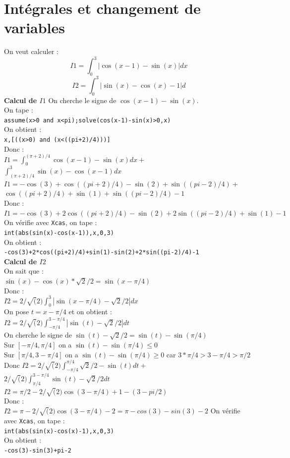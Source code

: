 \documentclass[a4paper,11pt]{book}
\begin{document}
\section{Int\'egrales et changement de variables}
On veut calculer :
$$I1=\int_0^3|\cos(x-1)-\sin(x)|dx$$
$$I2=\int_0^3|\sin(x)-\cos(x)-1|d$$
{\bf Calcul de $I1$}
On cherche le signe de $\cos(x-1)-\sin(x)$.\\
On tape :\\
{\tt assume(x>0 and x<pi);solve(cos(x-1)-sin(x)>0,x)}\\
On obtient :\\
{\tt x,[((x>0) and (x<((pi+2)/4)))]}\\
Donc :\\
$I1=\int_0^{(\pi+2)/4}\cos(x-1)-\sin(x)dx+$\\
$\int_{(\pi+2)/4}^3\sin(x)-\cos(x-1)dx$
$I1=-\cos(3)+\cos((pi+2)/4)-\sin(2)+\sin((pi-2)/4)+$\\
$\cos((pi+2)/4)+\sin(1)+\sin((pi-2)/4)-1$\\
Donc :\\
$I1=-\cos(3)+2\cos((pi+2)/4)-\sin(2)+2\sin((pi-2)/4)+\sin(1)-1$\\
On v\'erifie avec {\tt Xcas}, on tape :\\
{\tt int(abs(sin(x)-cos(x-1)),x,0,3)}\\
On obtient :\\
{\tt -cos(3)+2*cos((pi+2)/4)+sin(1)-sin(2)+2*sin((pi-2)/4)-1}\\
{\bf Calcul de $I2$}\\
On sait que :\\
$\sin(x)-\cos(x)*\sqrt 2/2=\sin(x-\pi/4)$\\
Donc :\\
$I2=2/\sqrt(2)\int_0^3|\sin(x-\pi/4)-\sqrt 2/2|dx$\\
On pose $t=x-\pi/4$ et on obtient :\\
$I2=2/\sqrt(2)\int_{-\pi/4}^{3-\pi/4}|\sin(t)-\sqrt 2/2|dt$\\
On cherche le signe de $\sin(t)-\sqrt 2/2=\sin(t)-\sin(\pi/4)$\\
Sur $[-\pi/4,\pi/4]$ on a $\sin(t)-\sin(\pi/4)\leq 0$ \\
Sur $[\pi/4,3-\pi/4]$ on a $\sin(t)-\sin(\pi/4)\geq 0$ car 
$3*\pi/4>3-\pi/4>\pi/2$\\
Donc
$I2=2/\sqrt(2)\int_{-\pi/4}^{\pi/4}\sqrt 2/2-\sin(t)dt+$\\
$2/\sqrt(2)\int_{\pi/4}^{3-\pi/4}\sin(t)-\sqrt 2/2dt$\\
$I2=\pi/2-2/\sqrt(2)\cos(3-\pi/4)+1-(3-pi/2)$\\
Donc :\\
$I2=\pi-2/\sqrt(2)\cos(3-\pi/4)-2=\pi-cos(3)-sin(3)-2$
On v\'erifie avec {\tt Xcas}, on tape :\\
{\tt int(abs(sin(x)-cos(x)-1),x,0,3)}\\
On obtient :\\
{\tt -cos(3)-sin(3)+pi-2}
\end{document}
